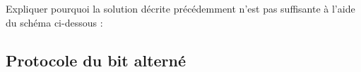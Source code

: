 \documentclass[a4paper,dvipsnames]{article}
\begin{document}
\begin{exercice}{}{}
  Expliquer pourquoi la solution décrite précédemment n'est pas suffisante à l'aide du schéma ci-dessous :
  \begin{center}
  \end{center}
\end{exercice}

\subsection{Protocole du bit alterné}
\end{document}
